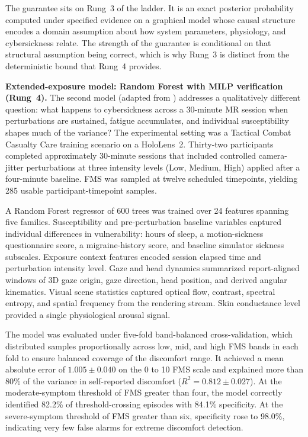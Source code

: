 \documentclass[graybox]{svmult}
\begin{document}
The guarantee sits on Rung~3 of the ladder. It is an exact posterior probability computed under specified evidence on a graphical model whose causal structure encodes a domain assumption about how system parameters, physiology, and cybersickness relate. The strength of the guarantee is conditional on that structural assumption being correct, which is why Rung~3 is distinct from the deterministic bound that Rung~4 provides.

\textbf{Extended-exposure model: Random Forest with MILP verification (Rung~4).}
The second model (adapted from \cite{}) addresses a qualitatively different question: what happens to cybersickness across a 30-minute MR session when perturbations are sustained, fatigue accumulates, and individual susceptibility shapes much of the variance? The experimental setting was a Tactical Combat Casualty Care training scenario on a HoloLens~2. Thirty-two participants completed approximately 30-minute sessions that included controlled camera-jitter perturbations at three intensity levels (Low, Medium, High) applied after a four-minute baseline. FMS was sampled at twelve scheduled timepoints, yielding 285 usable participant-timepoint samples.

A Random Forest regressor \citep{breiman2001randomforests} of 600 trees was trained over 24 features spanning five families. Susceptibility and pre-perturbation baseline variables captured individual differences in vulnerability: hours of sleep, a motion-sickness questionnaire score, a migraine-history score, and baseline simulator sickness subscales. Exposure context features encoded session elapsed time and perturbation intensity level. Gaze and head dynamics summarized report-aligned windows of 3D gaze origin, gaze direction, head position, and derived angular kinematics. Visual scene statistics captured optical flow, contrast, spectral entropy, and spatial frequency from the rendering stream. Skin conductance level provided a single physiological arousal signal.

The model was evaluated under five-fold band-balanced cross-validation, which distributed samples proportionally across low, mid, and high FMS bands in each fold to ensure balanced coverage of the discomfort range. It achieved a mean absolute error of $1.005 \pm 0.040$ on the 0 to 10 FMS scale and explained more than 80\% of the variance in self-reported discomfort ($R^2 = 0.812 \pm 0.027$). At the moderate-symptom threshold of FMS greater than four, the model correctly identified 82.2\% of threshold-crossing episodes with 84.1\% specificity. At the severe-symptom threshold of FMS greater than six, specificity rose to 98.0\%, indicating very few false alarms for extreme discomfort detection.
\end{document}

